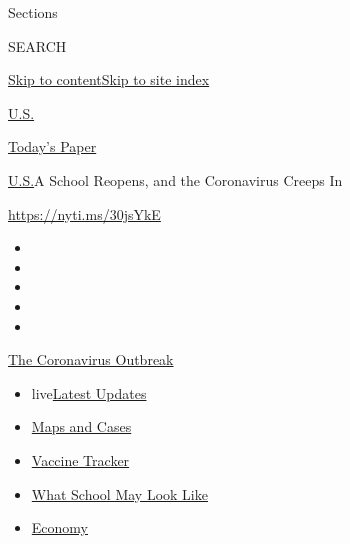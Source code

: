Sections

SEARCH

\protect\hyperlink{site-content}{Skip to
content}\protect\hyperlink{site-index}{Skip to site index}

\href{https://www.nytimes.com/section/us}{U.S.}

\href{https://myaccount.nytimes.com/auth/login?response_type=cookie\&client_id=vi}{}

\href{https://www.nytimes.com/section/todayspaper}{Today's Paper}

\href{/section/us}{U.S.}\textbar{}A School Reopens, and the Coronavirus
Creeps In

\url{https://nyti.ms/30jsYkE}

\begin{itemize}
\item
\item
\item
\item
\item
\end{itemize}

\href{https://www.nytimes.com/news-event/coronavirus?action=click\&pgtype=Article\&state=default\&region=TOP_BANNER\&context=storylines_menu}{The
Coronavirus Outbreak}

\begin{itemize}
\tightlist
\item
  live\href{https://www.nytimes.com/2020/08/01/world/coronavirus-covid-19.html?action=click\&pgtype=Article\&state=default\&region=TOP_BANNER\&context=storylines_menu}{Latest
  Updates}
\item
  \href{https://www.nytimes.com/interactive/2020/us/coronavirus-us-cases.html?action=click\&pgtype=Article\&state=default\&region=TOP_BANNER\&context=storylines_menu}{Maps
  and Cases}
\item
  \href{https://www.nytimes.com/interactive/2020/science/coronavirus-vaccine-tracker.html?action=click\&pgtype=Article\&state=default\&region=TOP_BANNER\&context=storylines_menu}{Vaccine
  Tracker}
\item
  \href{https://www.nytimes.com/interactive/2020/07/29/us/schools-reopening-coronavirus.html?action=click\&pgtype=Article\&state=default\&region=TOP_BANNER\&context=storylines_menu}{What
  School May Look Like}
\item
  \href{https://www.nytimes.com/live/2020/07/31/business/stock-market-today-coronavirus?action=click\&pgtype=Article\&state=default\&region=TOP_BANNER\&context=storylines_menu}{Economy}
\end{itemize}

